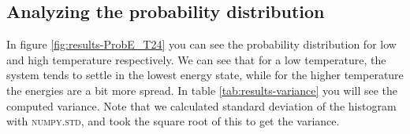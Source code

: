 \documentclass[../main.tex]{subfiles}
\begin{document}








%
%
%
%
%
%


\subsection{Analyzing the probability distribution}
In figure \ref{fig:results-ProbE_T24} you can see the probability distribution for low and high temperature respectively. We can see that for a low temperature, the system tends to settle in the lowest energy state, while for the higher temperature the energies are a bit more spread. In table \ref{tab:results-variance} you will see the computed variance. Note that we calculated standard deviation of the histogram with \textsc{numpy.std}, and took the square root of this to get the variance.
\end{document}
